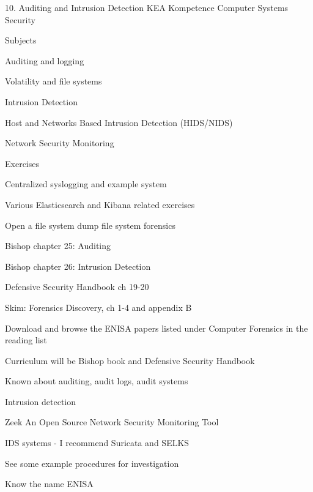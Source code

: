 \documentclass[Screen16to9,17pt]{foils}
\begin{document}
\mytitlepage
{10. Auditing and Intrusion Detection}
{KEA Kompetence Computer Systems Security \the\year}



\begin{list1}
\item Subjects
\begin{list2}
\item Auditing and logging
\item Volatility and file systems
\item Intrusion Detection
\item Host and Networks Based Intrusion Detection (HIDS/NIDS)
\item Network Security Monitoring
\end{list2}
\item Exercises
\begin{list2}
\item Centralized syslogging and example system
\item Various Elasticsearch and Kibana related exercises
\item Open a file system dump file system forensics
\end{list2}
\end{list1}




\begin{list1}
\item Bishop chapter 25: Auditing
\item Bishop chapter 26: Intrusion Detection
\item Defensive Security Handbook ch 19-20
\item Skim: Forensics Discovery, ch 1-4 and appendix B
\item Download and browse the ENISA papers listed under Computer Forensics in the reading list
\end{list1}

Curriculum will be Bishop book and Defensive Security Handbook


 
\begin{list2}
\item Known about auditing, audit logs, audit systems
\item Intrusion detection
\item Zeek An Open Source Network Security Monitoring Tool
\item IDS systems - I recommend Suricata and SELKS
\item See some example procedures for investigation
\item Know the name ENISA
\end{list2}
\end{document}
